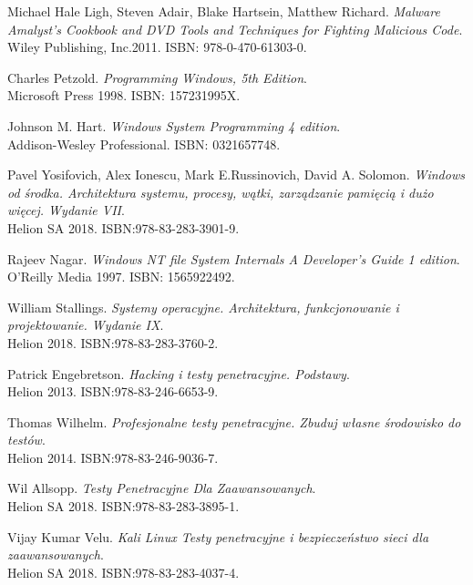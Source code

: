 \begin{thebibliography}{9}
Michael Hale Ligh, Steven Adair, Blake Hartsein, Matthew Richard. 
\textit{Malware Amalyst’s Cookbook and DVD Tools and Techniques for Fighting Malicious Code}. 
\\ Wiley Publishing, Inc.2011.  ISBN: 978-0-470-61303-0.




Charles Petzold. 
\textit{Programming Windows, 5th Edition}. 
\\ Microsoft Press 1998. ISBN: 157231995X.

Johnson M. Hart. 
\textit{Windows System Programming 4 edition}. 
\\ Addison-Wesley Professional. ISBN:  0321657748.


Pavel Yosifovich, Alex Ionescu, Mark E.Russinovich, David A. Solomon. 
\textit{Windows od środka. Architektura systemu, procesy, wątki, zarządzanie pamięcią i dużo więcej. Wydanie VII}. 
\\ Helion SA 2018. ISBN:978-83-283-3901-9.


Rajeev Nagar. 
\textit{Windows NT file System Internals A Developer’s Guide 1 edition}. 
\\ O'Reilly Media 1997. ISBN: 1565922492.

William Stallings. 
\textit{Systemy operacyjne. Architektura, funkcjonowanie i projektowanie. Wydanie IX}. 
\\ Helion 2018. ISBN:978-83-283-3760-2.





Patrick Engebretson. 
\textit{Hacking i testy penetracyjne. Podstawy}. 
\\ Helion 2013. ISBN:978-83-246-6653-9.


Thomas Wilhelm. 
\textit{Profesjonalne testy penetracyjne. Zbuduj własne środowisko do testów}. 
\\ Helion 2014. ISBN:978-83-246-9036-7.


Wil Allsopp. 
\textit{Testy Penetracyjne Dla Zaawansowanych}. 
\\ Helion SA 2018. ISBN:978-83-283-3895-1.

Vijay Kumar Velu. 
\textit{Kali Linux Testy penetracyjne i bezpieczeństwo sieci dla zaawansowanych}. 
\\ Helion SA 2018. ISBN:978-83-283-4037-4.







\end{thebibliography}
